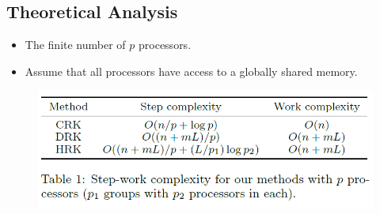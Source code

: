 \subsection{Theoretical Analysis}
\begin{frame}
	\begin{itemize}
		\setlength\itemsep{1em}
		\item The finite number of $p$ processors.
		\item Assume that all processors have access to a globally 
		shared memory.
	\end{itemize}
	\begin{figure}
		\includegraphics[scale=0.40]{figure/fig-complexity.png}
	\end{figure}
\end{frame}